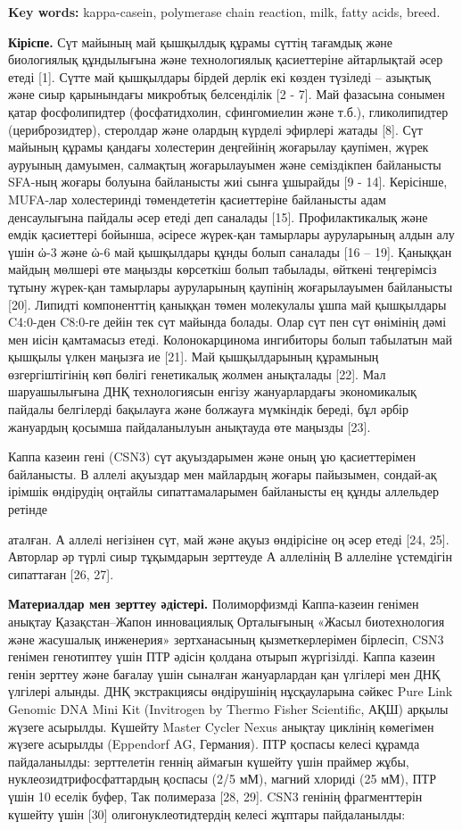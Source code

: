 {\bfseries Key words:} kappa-casein, polymerase chain reaction, milk, fatty
acids, breed.

{\bfseries Кіріспе.} Сүт майының май қышқылдық құрамы сүттің тағамдық және
биологиялық құндылығына және технологиялық қасиеттеріне айтарлықтай әсер
етеді {[}1{]}. Сүтте май қышқылдары бірдей дерлік екі көзден түзіледі --
азықтық және сиыр қарынындағы микробтық белсенділік {[}2 - 7{]}. Май
фазасына сонымен қатар фосфолипидтер (фосфатидхолин, сфингомиелин және
т.б.), гликолипидтер (цериброзидтер), стеролдар және олардың күрделі
эфирлері жатады {[}8{]}. Сүт майының құрамы қандағы холестерин
деңгейінің жоғарылау қаупімен, жүрек ауруының дамуымен, салмақтың
жоғарылауымен және семіздікпен байланысты SFA-ның жоғары болуына
байланысты жиі сынға ұшырайды {[}9 - 14{]}. Керісінше, MUFA-лар
холестеринді төмендететін қасиеттеріне байланысты адам денсаулығына
пайдалы әсер етеді деп саналады {[}15{]}. Профилактикалық және емдік
қасиеттері бойынша, әсіресе жүрек-қан тамырлары ауруларының алдын алу
үшін ὠ-3 және ὠ-6 май қышқылдары құнды болып саналады {[}16 -- 19{]}.
Қаныққан майдың мөлшері өте маңызды көрсеткіш болып табылады, өйткені
теңгерімсіз тұтыну жүрек-қан тамырлары ауруларының қаупінің
жоғарылауымен байланысты {[}20{]}. Липидті компоненттің қаныққан төмен
молекулалы ұшпа май қышқылдары C4:0-ден C8:0-ге дейін тек сүт майында
болады. Олар сүт пен сүт өнімінің дәмі мен иісін қамтамасыз етеді.
Колонокарцинома ингибиторы болып табылатын май қышқылы үлкен маңызға ие
{[}21{]}. Май қышқылдарының құрамының өзгергіштігінің көп бөлігі
генетикалық жолмен анықталады {[}22{]}. Мал шаруашылығына ДНҚ
технологиясын енгізу жануарлардағы экономикалық пайдалы белгілерді
бақылауға және болжауға мүмкіндік береді, бұл әрбір жануардың қосымша
пайдаланылуын анықтауда өте маңызды {[}23{]}.

Каппа казеин гені (CSN3) сүт ақуыздарымен және оның ұю қасиеттерімен
байланысты. В аллелі ақуыздар мен майлардың жоғары пайызымен, сондай-ақ
ірімшік өндірудің оңтайлы сипаттамаларымен байланысты ең құнды аллельдер
ретінде

аталған. А аллелі негізінен сүт, май және ақуыз өндірісіне оң әсер етеді
{[}24, 25{]}. Авторлар әр түрлі сиыр тұқымдарын зерттеуде А аллелінің В
аллеліне үстемдігін сипаттаған {[}26, 27{]}.

{\bfseries Материалдар мен зерттеу әдістері.} Полиморфизмді Каппа-казеин
генімен анықтау Қазақстан--Жапон инновациялық Орталығының «Жасыл
биотехнология және жасушалық инженерия» зертханасының қызметкерлерімен
бірлесіп, CSN3 генімен генотиптеу үшін ПТР әдісін қолдана отырып
жүргізілді. Каппа казеин генін зерттеу және бағалау үшін сыналған
жануарлардан қан үлгілері мен ДНҚ үлгілері алынды. ДНҚ экстракциясы
өндірушінің нұсқауларына сәйкес Pure Link Genomic DNA Mini Kit
(Invitrogen by Thermo Fisher Scientific, АҚШ) арқылы жүзеге асырылды.
Күшейту Master Cycler Nexus анықтау циклінің көмегімен жүзеге асырылды
(Eppendorf AG, Германия). ПТР қоспасы келесі құрамда пайдаланылды:
зерттелетін геннің аймағын күшейту үшін праймер жұбы,
нуклеозидтрифосфаттардың қоспасы (2/5 мМ), магний хлориді (25 мМ), ПТР
үшін 10 еселік буфер, Так полимераза {[}28, 29{]}. CSN3 генінің
фрагменттерін күшейту үшін {[}30{]} олигонуклеотидтердің келесі жұптары
пайдаланылды:

